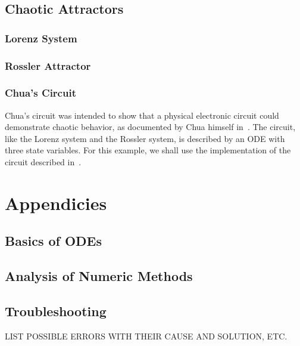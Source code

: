 \documentclass[letterpaper,10pt]{book}
\begin{document}
  \chapter{Chaotic Attractors}
    \section{Lorenz System}
    \section{Rossler Attractor}
    \section{Chua's Circuit}
      Chua's circuit was intended to show that a physical electronic circuit could demonstrate chaotic behavior, as documented by Chua himself in~\cite{chua1992genesis}.  The circuit, like the Lorenz system and the Rossler system, is described by an ODE with three state variables.  For this example, we shall use the implementation of the circuit described in~\cite{kennedy1992robust}.


\part{Appendicies}
  \chapter{Basics of ODEs}
  
  \chapter{Analysis of Numeric Methods}
  
  \chapter{Troubleshooting}
    LIST POSSIBLE ERRORS WITH THEIR CAUSE AND SOLUTION, ETC.
    


  
\printindex
\end{document}
